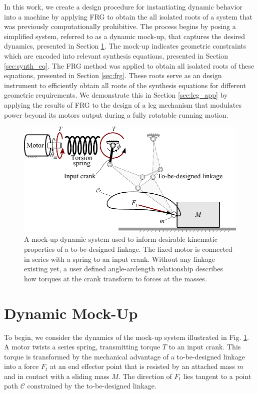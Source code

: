 \documentclass[journal]{IEEEtran}
\begin{document}
In this work, we create a design procedure for instantiating dynamic behavior into a machine by applying FRG to obtain the all isolated roots of a system that was previously computationally prohibitive.
The process begins by posing a simplified system, referred to as a dynamic mock-up, that captures the desired dynamics, presented in Section \ref{sec:dynamic_mock-up}.
The mock-up indicates geometric constraints which are encoded into relevant synthesis equations, presented in Section \ref{sec:synth_eq}.
The FRG method was applied to obtain all isolated roots of these equations, presented in Section \ref{sec:frg}.
These roots serve as an design instrument to efficiently obtain all roots of the synthesis equations for different geometric requirements.
We demonstrate this in Section \ref{sec:leg_app} by applying the results of FRG to the design of a leg mechanism that modulates power beyond its motors output during a fully rotatable running motion.






\begin{figure}[!b]
\centering
\includegraphics[width=1\linewidth]{dynamic_model}
\caption{A mock-up dynamic system used to inform desirable kinematic properties of a to-be-designed linkage.  The fixed motor is connected in series with a spring to an input crank.  Without any linkage existing yet, a user defined angle-arclength relationship describes how torques at the crank transform to forces at the masses.}
\label{dynamic_model}
\end{figure}


\section{Dynamic Mock-Up}
\label{sec:dynamic_mock-up}

To begin, we consider the dynamics of the mock-up system illustrated in Fig. \ref{dynamic_model}.
A motor twists a series spring, transmitting torque $T$ to an input crank.
This torque is transformed by the mechanical advantage of a to-be-designed linkage into a force $F_t$ at an end effector point that is resisted by an attached mass $m$ and in contact with a sliding mass $M$.
The direction of $F_t$ lies tangent to a point path $\mathcal{C}$ constrained by the to-be-designed linkage.
\end{document}

